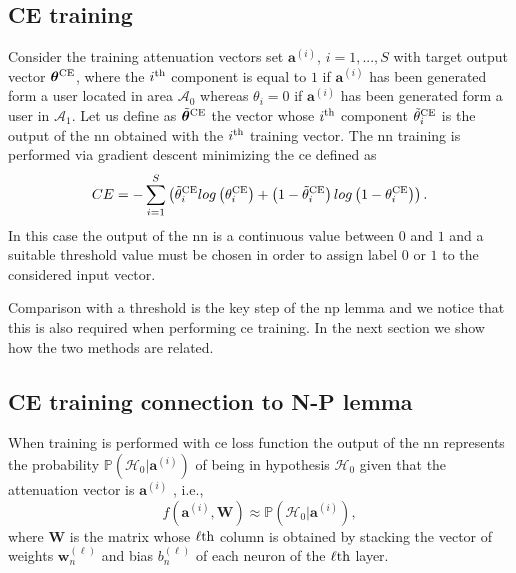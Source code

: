 \documentclass[draftcls,onecolumn,12pt]{IEEEtran}
\begin{document}
\subsection{CE training}
Consider the training attenuation vectors set $\bm{a}^{(i)}$, $i=1,...,S$ with target output vector $\bm{\theta}^{\rm CE}$, where the $i^{\rm th}$ component is equal to $1$ if $\bm{a}^{(i)}$ has been generated form a user located in area $\mathcal{A}_0$ whereas $\theta_i=0$ if $\bm{a}^{(i)}$ has been generated form a user in $\mathcal{A}_1$. Let us define as $\tilde{\bm{\theta}}^{\rm CE}$ the vector whose $i^{\rm th}$ component $\tilde{\theta}_i^{\rm CE}$ is the output of the \ac{nn} obtained with the $i^{\rm th}$ training vector. The \ac{nn} training is performed via gradient descent minimizing the \ac{ce} defined as
\begin{equation}\label{eq:ce}
CE = -\sum_{i=1}^{S}\left(\tilde{\theta}_i^{\rm CE}log\left(\theta_i^{\rm CE}\right)+\left(1-\tilde{\theta}_i^{\rm CE}\right)log\left(1-\theta_i^{\rm CE}\right) \right).
\end{equation}
In this case the output of the \ac{nn} is a continuous value between $0$ and $1$ and a suitable threshold value must be chosen in order to assign label $0$ or $1$ to the considered input vector.

Comparison with a threshold is the key step of the \ac{np} lemma and we notice that this is also required when performing \ac{ce} training. In the next section we show how the two methods are related.

\subsection{CE training connection to N-P lemma}
When training is performed with \ac{ce} loss function the output of the \ac{nn} represents the probability $\mathbb{P}(\mathcal{H}_0|\bm{a}^{(i)})$ of being in hypothesis $\mathcal{H}_0$ given that the attenuation vector is $\bm{a}^{(i)}$ \cite{Bishop2006}, i.e.,
\begin{equation}
    f(\bm{a}^{(i)},\bm{W}) \approx \mathbb{P}(\mathcal{H}_0|\bm{a}^{(i)}),
\end{equation} 
where $\bm{W}$ is the matrix whose $\ell{\rm th}$ column is obtained by stacking the vector of weights $\bm{w}_n^{(\ell)}$ and bias $b_n^{(\ell)}$ of each neuron of the $\ell{\rm th}$ layer.
\end{document}
